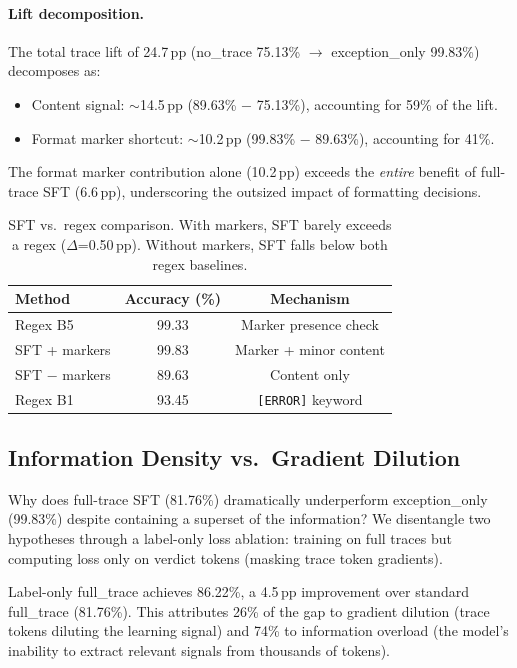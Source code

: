 \documentclass[11pt,a4paper]{article}
\newcommand{\pp}{\,\text{pp}}
\begin{document}
\paragraph{Lift decomposition.}
The total trace lift of 24.7$\pp$ (no\_trace 75.13\% $\to$ exception\_only 99.83\%) decomposes as:
\begin{itemize}
    \item Content signal: ${\sim}$14.5$\pp$ (89.63\% $-$ 75.13\%), accounting for 59\% of the lift.
    \item Format marker shortcut: ${\sim}$10.2$\pp$ (99.83\% $-$ 89.63\%), accounting for 41\%.
\end{itemize}
The format marker contribution alone (10.2$\pp$) exceeds the \emph{entire} benefit of full-trace SFT (6.6$\pp$), underscoring the outsized impact of formatting decisions.

\begin{table}[t]
\centering
\small
\begin{tabular}{lcc}
\toprule
\textbf{Method} & \textbf{Accuracy (\%)} & \textbf{Mechanism} \\
\midrule
Regex B5 & 99.33 & Marker presence check \\
SFT + markers & 99.83 & Marker + minor content \\
SFT $-$ markers & 89.63 & Content only \\
Regex B1 & 93.45 & \texttt{[ERROR]} keyword \\
\bottomrule
\end{tabular}
\caption{SFT vs.\ regex comparison. With markers, SFT barely exceeds a regex ($\Delta$=0.50$\pp$). Without markers, SFT falls below both regex baselines.}
\label{tab:sft-vs-regex}
\end{table}

\subsection{Information Density vs.\ Gradient Dilution}
\label{sec:density}

Why does full-trace SFT (81.76\%) dramatically underperform exception\_only (99.83\%) despite containing a superset of the information?
We disentangle two hypotheses through a label-only loss ablation: training on full traces but computing loss only on verdict tokens (masking trace token gradients).

Label-only full\_trace achieves 86.22\%, a 4.5$\pp$ improvement over standard full\_trace (81.76\%).
This attributes 26\% of the gap to gradient dilution (trace tokens diluting the learning signal) and 74\% to information overload (the model's inability to extract relevant signals from thousands of tokens).
\end{document}
